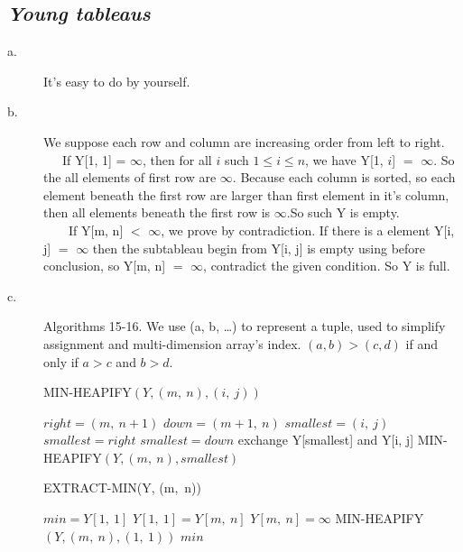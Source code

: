 \documentclass{article}
\begin{document}
\subsection*{\textit{\textbf{Young tableaus}}}
\begin{description}
\item[a. ] It's easy to do by yourself.
\item[b. ] We suppose each row and column are increasing order from left to right.\\
\indent~~~If Y[1, 1] = $\infty$, then for all $i$ such $1 \le i \le n$, we have Y[1, $i$] $=$ $\infty$. So the all elements of first row are $\infty$. Because each column is sorted, so each element beneath the first row are larger than first element in it's column, then all elements beneath the first row is $\infty$.So such Y is empty.\\
\indent~~~~If Y[m, n] $<$ $\infty$, we prove by contradiction. If there is a element Y[i, j] $=$ $\infty$ then the subtableau begin from Y[i, j] is empty using before conclusion, so Y[m, n] $=$ $\infty$, contradict the given condition. So Y is full.
\item[c. ] Algorithms 15-16. We use (a, b, \ldots) to represent a tuple, used to simplify assignment and multi-dimension array's index. $(a, b) > (c, d)$ if and only if $a > c$ and $b > d$.
  \begin{algorithm}
    \caption{MIN-HEAPIFY$(Y, (m,\ n), (i,\ j))$}
    \begin{algorithmic}[1]
      \STATE $right = (m,\ n+1)$
      \STATE $down = (m+1,\ n)$
      \STATE $smallest = (i,\ j)$
      \STATE $smallest = right$
      \ENDIF
      \STATE $smallest = down$
      \ENDIF
      \STATE exchange Y[smallest] and Y[i, j]
      \STATE MIN-HEAPIFY$(Y, (m,\ n), smallest)$
      \ENDIF
    \end{algorithmic}
  \end{algorithm}

  \begin{algorithm}
    \caption{EXTRACT-MIN(Y, (m,\ n))}
    \begin{algorithmic}[1]
      \STATE $min = Y[1,\ 1]$
      \STATE $Y[1,\ 1] = Y[m,\ n]$
      \STATE $Y[m,\ n] = \infty$
      \STATE MIN-HEAPIFY$(Y, (m,\ n), (1,\ 1))$
      \RETURN $min$
    \end{algorithmic}
  \end{algorithm}


\end{description}
\end{document}
